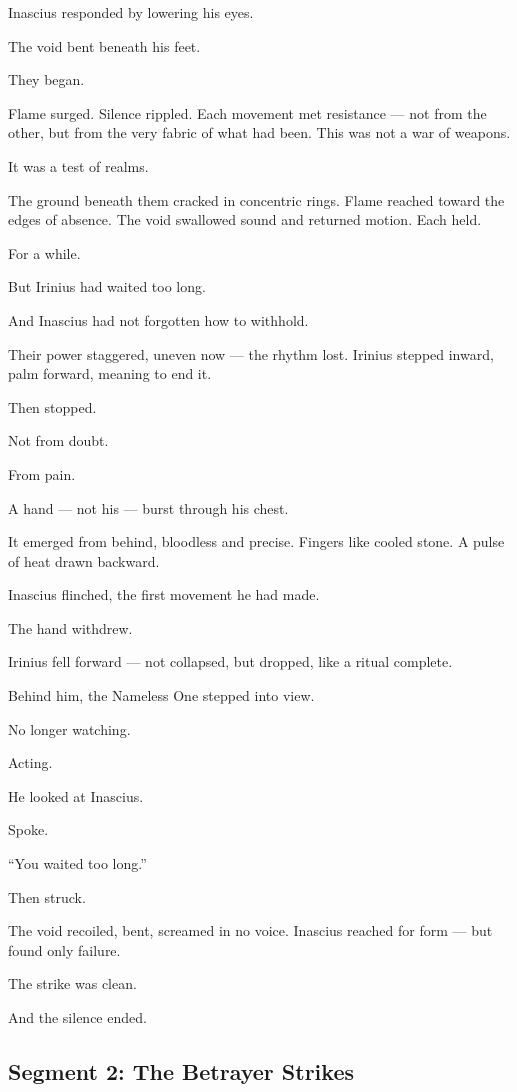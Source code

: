\documentclass[9pt]{article}
\begin{document}
Inascius responded by lowering his eyes.

The void bent beneath his feet.

They began.

Flame surged. Silence rippled. Each movement met resistance — not from the other, but from the very fabric of what had been. This was not a war of weapons.

It was a test of realms.

The ground beneath them cracked in concentric rings. Flame reached toward the edges of absence. The void swallowed sound and returned motion. Each held.

For a while.

But Irinius had waited too long.

And Inascius had not forgotten how to withhold.

Their power staggered, uneven now — the rhythm lost. Irinius stepped inward, palm forward, meaning to end it.

Then stopped.

Not from doubt.

From pain.

A hand — not his — burst through his chest.

It emerged from behind, bloodless and precise. Fingers like cooled stone. A pulse of heat drawn backward.

Inascius flinched, the first movement he had made.

The hand withdrew.

Irinius fell forward — not collapsed, but dropped, like a ritual complete.

Behind him, the Nameless One stepped into view.

No longer watching.

Acting.

He looked at Inascius.

Spoke.

``You waited too long.''

Then struck.

The void recoiled, bent, screamed in no voice. Inascius reached for form — but found only failure.

The strike was clean.

And the silence ended.


\newpage

\subsection*{Segment 2: The Betrayer Strikes}
\end{document}
